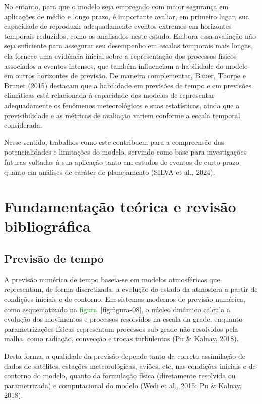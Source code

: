 \documentclass[12pt,a4paper,oneside]{book}
\begin{document}
No entanto, para que o modelo seja empregado com maior segurança em aplicações de médio e longo prazo, é importante avaliar, em primeiro lugar, sua capacidade de reproduzir adequadamente eventos extremos em horizontes temporais reduzidos, como os analisados neste estudo. Embora essa avaliação não seja suficiente para assegurar seu desempenho em escalas temporais mais longas, ela fornece uma evidência inicial sobre a representação dos processos físicos associados a eventos intensos, que também influenciam a habilidade do modelo em outros horizontes de previsão. De maneira complementar, Bauer, Thorpe e Brunet (2015) destacam que a habilidade em previsões de tempo e em previsões climáticas está relacionada à capacidade dos modelos de representar adequadamente os fenômenos meteorológicos e suas estatísticas, ainda que a previsibilidade e as métricas de avaliação variem conforme a escala temporal considerada.

Nesse sentido, trabalhos como este contribuem para a compreensão das potencialidades e limitações do modelo, servindo como base para investigações futuras voltadas à sua aplicação tanto em estudos de eventos de curto prazo quanto em análises de caráter de planejamento (SILVA et al., 2024).

\chapter{Fundamentação teórica e revisão bibliográfica}

\section{Previsão de tempo}

A previsão numérica de tempo baseia-se em modelos atmosféricos que representam, de forma discretizada, a evolução do estado da atmosfera a partir de condições iniciais e de contorno. Em sistemas modernos de previsão numérica, como esquematizado na \textcolor{green}{figura~\ref*{fig:figura-08}}, o núcleo dinâmico calcula a evolução dos movimentos e processos resolvidos na escala da grade, enquanto parametrizações físicas representam processos sub-grade não resolvidos pela malha, como radiação, convecção e trocas turbulentas (Pu \& Kalnay, 2018).

Desta forma, a qualidade da previsão depende tanto da correta assimilação de dados de satélites, estações meteorológicas, aviões, etc, nas condições iniciais e de contorno do modelo, quanto da formulação física (diretamente resolvida ou parametrizada) e computacional do modelo (\href{https://www.ecmwf.int/sites/default/files/elibrary/2015/15259-modelling-infrastructure-integrated-forecasting-system-recent-advances-and-future-challenges.pdf}{Wedi et al., 2015;} Pu \& Kalnay, 2018).
\end{document}
